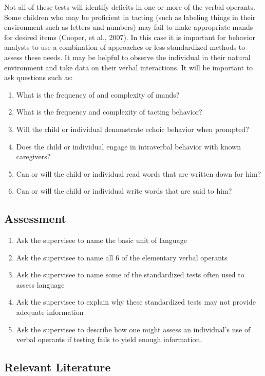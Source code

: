 Not all of these tests will identify deficits in one or more of the verbal operants. Some children who may be proficient in tacting (such as labeling things in their environment such as letters and numbers) may fail to make appropriate mands for desired items (Cooper, et al., 2007).  In this case it is important for behavior analysts to use a combination of approaches or less standardized methods to assess these needs.  It may be helpful to observe the individual in their natural environment and take data on their verbal interactions.  It will be important to ask questions such as:
\begin{enumerate}
\item What is the frequency of and complexity of mands?
\item What is the frequency and complexity of tacting behavior?
\item Will the child or individual demonstrate echoic behavior when prompted?
\item Does the child or individual engage in intraverbal behavior with known caregivers?
\item Can or will the child or individual read words that are written down for him?
\item Can or will the child or individual write words that are said to him? 
\end{enumerate}
%
\subsection{Assessment}
\begin{enumerate}
\item Ask the supervisee to name the basic unit of language
\item Ask the supervisee to name all 6 of the elementary verbal operants
\item Ask the supervisee to name some of the standardized tests often used to assess language
\item Ask the supervisee to explain why these standardized tests may not provide adequate information
\item Ask the supervisee to describe how one might assess an individual's use of verbal operants if testing fails to yield enough information.
\end{enumerate}
%
\subsection{Relevant Literature}
\begin{refsection}
\nocite{cooper2007applied,
    partington1998assessment,
    semel2003clinical,
    skinner1957verbal,
    sundberg2008verbal,
    sundberg1998teaching}
\printbibliography[heading=none]
\end{refsection}
%
